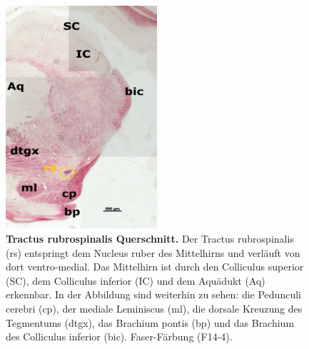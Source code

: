 \documentclass[12pt,a4paper,pdftex]{article}
\begin{document}
\begin{figure}[H]
    \centering
    \includegraphics[width=0.5\textwidth]{pictures/Bilder_Laura/rubrospinal_tract_F14_4P_025x.png}
    \caption[Tractus rubrospinalis Querschnitt]{\textbf{Tractus rubrospinalis Querschnitt.} Der Tractus rubrospinalis (rs) entspringt dem Nucleus ruber des Mittelhirns und verläuft von dort ventro-medial. Das Mittelhirn ist durch den Colliculus superior (SC), dem Colliculus inferior (IC) und dem Aquädukt (Aq) erkennbar. In der Abbildung sind weiterhin zu sehen: die Pedunculi cerebri (cp), der mediale Leminiscus (ml), die dorsale Kreuzung des Tegmentums (dtgx), das Brachium pontis (bp) und das Brachium des Colliculus inferior (bic). Faser-Färbung (F14-4).}
    \label{fig:rubrospinal_tract}
\end{figure}
\end{document}
